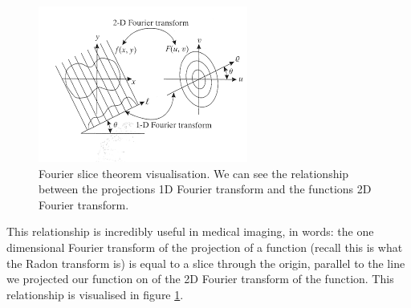 \documentclass{article}
\theoremstyle{definition}
\begin{document}
\begin{figure}[H]
	\includegraphics[width=\linewidth]{fourierslicetheorem.jpg}
	\caption{Fourier slice theorem visualisation. We can see the relationship between the projections 1D Fourier transform and the functions 2D Fourier transform. }
	\label{fourierslicetheorem}
\end{figure}

This relationship is incredibly useful in medical imaging, in words: the one dimensional Fourier transform of the projection of a function (recall this is what the Radon transform is) is equal to a slice through the origin, parallel to the line we projected our function on of the 2D Fourier transform of the function. This relationship is visualised in figure \ref{fourierslicetheorem}.
\end{document}
